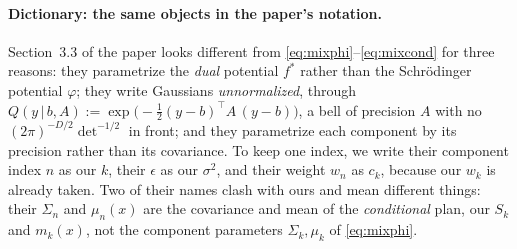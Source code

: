 \documentclass[11pt]{article}
\theoremstyle{definition}
\theoremstyle{plain}
\begin{document}
\paragraph{Dictionary: the same objects in the paper's notation.}
Section~3.3 of the paper looks different from \eqref{eq:mixphi}--\eqref{eq:mixcond} for three
reasons: they parametrize the \emph{dual} potential $f^*$ rather than the Schr\"odinger potential
$\varphi$; they write Gaussians \emph{unnormalized}, through
$Q(y\,|\,b,A):=\exp\!\big(-\tfrac12(y-b)^{\!\top}A\,(y-b)\big)$, a bell of precision $A$ with no
$(2\pi)^{-D/2}\det^{-1/2}$ in front; and they parametrize each component by its precision
rather than its covariance. To keep one index, we write their component index $n$ as our $k$,
their $\epsilon$ as our $\sigma^2$, and their weight $w_n$ as $c_k$, because our $w_k$ is
already taken. Two of their names clash with ours and mean different things: their
$\Sigma_n$ and $\mu_n(x)$ are the covariance and mean of the \emph{conditional} plan, our
$S_k$ and $m_k(x)$, not the component parameters $\Sigma_k,\mu_k$ of \eqref{eq:mixphi}.
\end{document}
